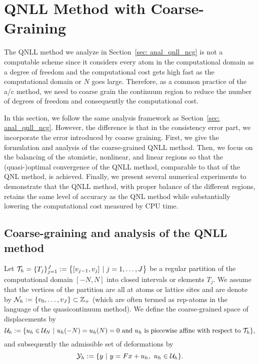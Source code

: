 \section{QNLL Method with Coarse-Graining}
\label{sec: qnll_cg}

The QNLL method we analyze in Section~\ref{sec: anal_qnll_ncg} is not a computable scheme since it considers every atom in the computational domain as a degree of freedom and the computational cost gets high fast as the computational domain or $N$ goes large. Therefore, as a common practice of the a/c method, we need to coarse grain the continuum region to reduce the number of degrees of freedom and consequently the computational cost. 

In this section, we follow the same analysis framework as Section~\ref{sec: anal_qnll_ncg}. However, the difference is that in the consistency error part, we incorporate the error introduced by coarse graining. First, we give the formulation and analysis of the coarse-grained QNLL method. Then, we focus on the balancing of the atomistic, nonlinear, and linear regions so that the (quasi-)optimal convergence of the QNLL method, comparable to that of the QNL method, is achieved. Finally, we present several numerical experiments to demonstrate that the QNLL method, with proper balance of the different regions, retains the same level of accuracy as the QNL method while substantially lowering the computational cost measured by CPU time.


\subsection{Coarse-graining and analysis of the QNLL method}
\label{sec: anal_qnll_cg}


Let $\mathcal{T}_{h} = \{T_j\}_{j = 1}^{J} := \big\{[v_{j-1},v_{j}]\ | \ j=1,\dots,J\big\}$ be a regular partition of the computational domain $[-N,N]$ into closed intervals or elements $T_j$. We assume that the vertices of the partition are all at atoms or lattice sites and are denote  by $\mathcal{N}_{h} := \{v_{0},\dots,v_J \} \subset \mathbb{Z}_{+}$ (which are often termed as rep-atoms in the language of the quasicontinuum method). We define the coarse-grained space of displacements by
\begin{equation}\label{UhNL space}
	\mathcal{U}_{h}:=\{u_{h}\in\mathcal{U}_{N} \ | \ u_{h}(-N)=u_{h}(N)=0 \text{ and }u_{h} \text{ is piecewise affine with respect to }\mathcal{T}_{h}\},
\end{equation}
and subsequently the admissible set of deformations by
\begin{equation}\label{YhNL space}
	\mathcal{Y}_{h}:=\{y\ | \  y = Fx+u_{h}, \ u_{h}\in\mathcal{U}_{h}\}.
\end{equation}

